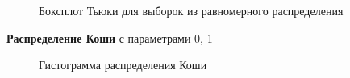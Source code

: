 \documentclass[12pt]{article}
\begin{document}
\begin{figure}[h!]
\centering
{}
\label{2_pic:2}
\caption{Боксплот Тьюки для выборок из равномерного распределения}
\end{figure}


\newpage
\textbf{Распределение Коши} с параметрами 0, 1

\begin{figure}[h!]
	\centering
	\caption{Гистограмма распределения Коши}
	\label{3_pic:1}
\end{figure}
\end{document}
